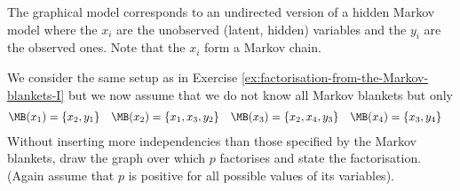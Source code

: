 \begin{solution}
The graphical model corresponds to an undirected version of a hidden
Markov model where the $x_i$ are the unobserved (latent, hidden)
variables and the $y_i$ are the observed ones. Note that the $x_i$
form a Markov chain.

\end{solution}

\label{ex:factorisation-from-the-Markov-blankets-II}

We consider the same setup as in Exercise \ref{ex:factorisation-from-the-Markov-blankets-I} but we now assume that we do not know all Markov blankets but only
\begin{align}
  \MB(x_1) &= \{x_2, y_1\} & \MB(x_2)&=\{x_1, x_3, y_2\} & \MB(x_3)&=\{x_2, x_4, y_3\} & \MB(x_4)&=\{x_3, y_4\}
\end{align}
Without inserting more independencies than those specified by the
Markov blankets, draw the graph over which $p$ factorises and state
the factorisation. (Again assume that $p$ is positive for all possible
values of its variables).

